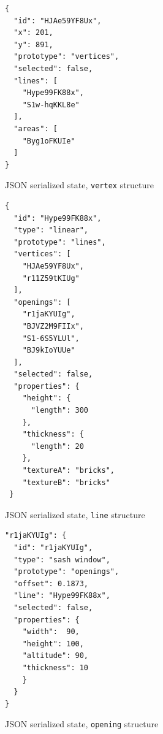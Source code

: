 \begin{listing}
\begin{verbatim}
{
  "id": "HJAe59YF8Ux",
  "x": 201,
  "y": 891,
  "prototype": "vertices",
  "selected": false,
  "lines": [
    "Hype99FK88x",
    "S1w-hqKKL8e"
  ],
  "areas": [
    "Byg1oFKUIe"
  ]
}
\end{verbatim}
\caption{JSON serialized state, {\tt vertex} structure} 
\label{lst:vertex}
\end{listing}

\begin{listing}
\begin{verbatim}
{
  "id": "Hype99FK88x",
  "type": "linear",
  "prototype": "lines",
  "vertices": [
    "HJAe59YF8Ux",
    "r11Z59tKIUg"
  ],
  "openings": [
    "r1jaKYUIg",
    "BJVZ2M9FIIx",
    "S1-6S5YLUl",
    "BJ9kIoYUUe"
  ],
  "selected": false,
  "properties": {
    "height": {
      "length": 300
    },
    "thickness": {
      "length": 20
    },
    "textureA": "bricks",
    "textureB": "bricks"
 }
\end{verbatim}
\caption{JSON serialized state, {\tt line} structure} 
\label{lst:line}
\end{listing}

\iffalse

\begin{listing}
\begin{verbatim}
"r1jaKYUIg": {
  "id": "r1jaKYUIg",
  "type": "sash window",
  "prototype": "openings",
  "offset": 0.1873,
  "line": "Hype99FK88x",
  "selected": false,
  "properties": {
    "width":  90,
    "height": 100,
    "altitude": 90,
    "thickness": 10
    }
  }
}
\end{verbatim}
\caption{JSON serialized state, {\tt opening} structure} 
\label{lst:opening}
\end{listing}



